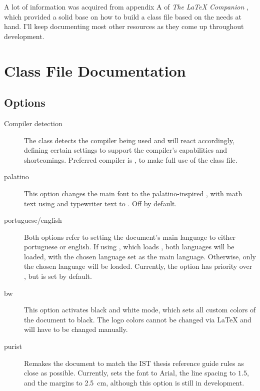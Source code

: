\documentclass[palatino,english]{ist-report}
\begin{document}
A lot of information was acquired from appendix A of \textit{The \LaTeX{} Companion} \cite{latex-companion}, which provided a solid base on how to build a class file based on the needs at hand. I'll keep documenting most other resources as they come up throughout development.

\section{Class File Documentation}

\subsection{Options}

\begin{description}
	\item [Compiler detection] The class detects the compiler being used and will react accordingly, defining certain settings to support the compiler's capabilities and shortcomings. Preferred compiler is \XeLaTeX{}, to make full use of the class file\footnotemark{}. 
	\item [palatino] This option changes the main font to the palatino-inspired , with math text using  and typewriter text to . Off by default.
	\item [portuguese/english] Both options refer to setting the document's main language to either portuguese or english. If using \XeLaTeX{}, which loads , both languages will be loaded, with the chosen language set as the main language. Otherwise, only the chosen language will be loaded. Currently, the  option has priority over , but  is set by default.
	\item [bw] This option activates black and white mode, which sets all custom colors of the document to black. The logo colors cannot be changed via \LaTeX{} and will have to be changed manually.
	\item [purist] Remakes the document to match the IST thesis reference guide rules as close as possible. Currently, sets the font to Arial, the line spacing to $1.5$, and the margins to \SI{2.5}{\centi\meter}, although this option is still in development.
\end{description}
\end{document}
